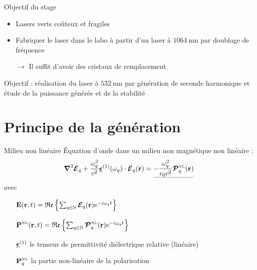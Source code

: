 \documentclass{beamer}
\newcommand{\lmbd}[1]{\SI{#1}{\nano\metre}}
\begin{document}
{\begin{frame}{Objectif du stage}
\begin{itemize}
\item Lasers verts coûteux et fragiles
\item Fabriquer le laser dans le labo à partir d'un laser à $\lmbd{1064}$ par doublage de fréquence
\item[$\rightarrow$] Il suffit d'avoir des cristaux de remplacement
\end{itemize}
\begin{beamerboxesrounded}[width=0.9\textwidth]{}
Objectif : réalisation du laser à $\lmbd{532}$ par génération de seconde harmonique et étude de la puissance générée et de la stabilité
\end{beamerboxesrounded}
\end{frame}

}

\section{Principe de la génération}

\begin{frame}{Milieu non linéaire}
Équation d'onde dans un milieu non magnétique non linéaire :
\begin{equation*}
\boldsymbol{\nabla}^2 \boldsymbol{\E}_q + \frac{\omega_q^2}{c^2}\tens\epsilon^{(1)}(\omega_q)\cdot \v \E_q(\v r) = \uline{red}{ - \frac{\omega_q^2}{\epsilon_0 c^2} \boldsymbol{\mathcal{P}}^\mathsc{NL}_q(\v r) }
\end{equation*}
avec
\begin{enumerate}
\item[ ] $\v E(\v r, t) = \mathfrak{Re} \left\{ \sum_{q \in \mathbb N} \v {\boldsymbol{\mathcal E}}_q (\v r) \e{-i \omega_q t} \right\}$
\item[ ] $\v P^\mathsc{NL} (\v r, t) = \mathfrak{Re} \left\{ \sum_{q \in \mathbb N} \v {\boldsymbol{\mathcal P}}^\mathsc{NL}_q (\v r) \e{-i \omega_q t} \right\}$
\item[ ] $\tens \epsilon^{(1)}$ le tenseur de permittivité diélectrique relative (linéaire)
\item[ ] $\v P^\mathsc{NL}_q$ la partie non-linéaire de la polarisation
\end{enumerate}
\end{frame}
\end{document}
